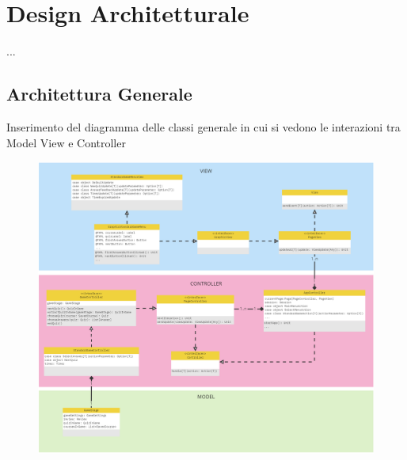 

\chapter{Design Architetturale}
    ...
    \section{Architettura Generale}
    Inserimento del diagramma delle classi generale in cui si vedono le interazioni tra Model View e Controller
    
    \begin{figure}[H]
        \centering
        \includegraphics[width=\textwidth]{Miro/general_architecture.png}
        \label{fig:Sprint9BL2}
    \end{figure}
    
